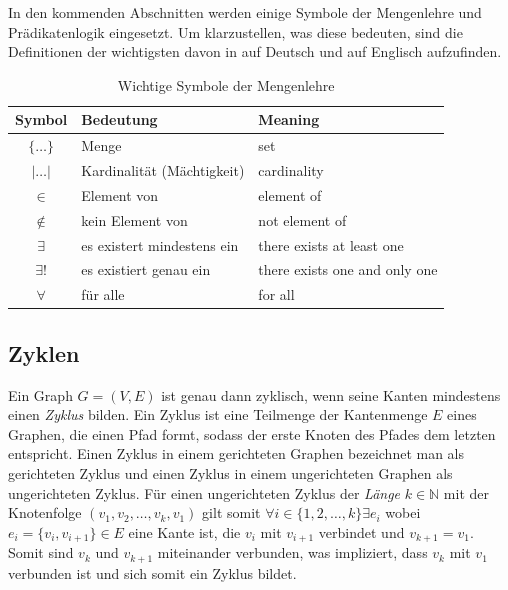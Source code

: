             In den kommenden Abschnitten werden einige Symbole der Mengenlehre und Prädikatenlogik eingesetzt. Um klarzustellen, was diese bedeuten, sind die Definitionen der wichtigsten davon in  auf Deutsch und auf Englisch aufzufinden.

            \begin{table}
                \centering
                \begin{tabular}{|c|l|l|} \hline
                    Symbol & Bedeutung & Meaning\\ \hline
                    $\{\ldots\}$ & Menge & set\\
                    $|\ldots|$ & Kardinalität (Mächtigkeit) & cardinality\\
                    $\in$ & Element von & element of\\
                    $\notin$ & kein Element von & not element of\\
                    $\exists$ & es existert mindestens ein & there exists at least one\\
                    $\exists!$ & es existiert genau ein & there exists one and only one\\
                    $\forall$ & für alle & for all\\ \hline
                \end{tabular}
                \caption{Wichtige Symbole der Mengenlehre\\\cite{EZ:Web23, EZ:Web24}}
                \label{tab:symbols}
            \end{table}

        \subsection{Zyklen}

            Ein Graph $G = (V, E)$ ist genau dann zyklisch, wenn seine Kanten mindestens einen \emph{Zyklus} bilden. Ein Zyklus ist eine Teilmenge der Kantenmenge $E$ eines Graphen, die einen Pfad formt, sodass der erste Knoten des Pfades dem letzten entspricht. Einen Zyklus in einem gerichteten Graphen bezeichnet man als gerichteten Zyklus und einen Zyklus in einem ungerichteten Graphen als ungerichteten Zyklus. Für einen ungerichteten Zyklus der \emph{Länge} $k \in \mathbb{N}$ mit der Knotenfolge $(v_1, v_2, \ldots, v_k, v_1)$  gilt somit $\forall i \in \{1, 2, \ldots, k\} \exists e_i$ wobei $e_i = \{v_i, v_{i+1}\} \in E$ eine Kante ist, die $v_i$ mit $v_{i+1}$ verbindet und $v_{k+1} = v_1$. Somit sind $v_{k}$ und $v_{k+1}$ miteinander verbunden, was impliziert, dass $v_{k}$ mit $v_1$ verbunden ist und sich somit ein Zyklus bildet. \cite{EZ:Web11, EZ:Web12}
            

